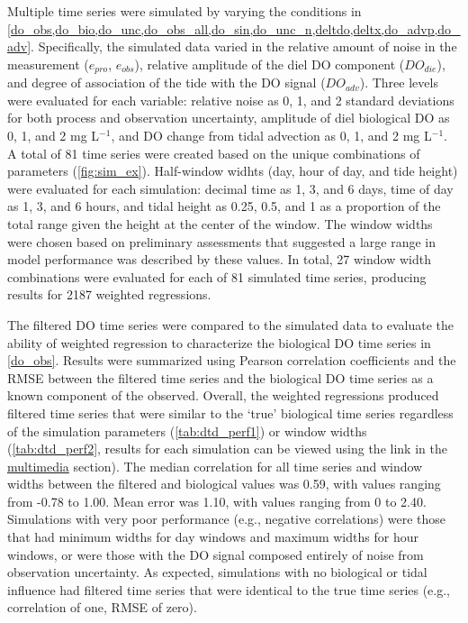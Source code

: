 \documentclass[letterpaper,12pt,oneside]{article}\usepackage[]{graphicx}\usepackage[]{color}
\begin{document}
Multiple time series were simulated by varying the conditions in \cref{do_obs,do_bio,do_unc,do_obs_all,do_sin,do_unc_n,deltdo,deltx,do_advp,do_adv}. Specifically, the simulated data varied in the relative amount of noise in the measurement ($e_{pro}$, $e_{obs}$), relative amplitude of the diel \ac{DO} component ($DO_{die}$), and degree of association of the tide with the \ac{DO} signal ($DO_{adv}$).  Three levels were evaluated for each variable: relative noise as 0, 1, and 2 standard deviations for both process and observation uncertainty, amplitude of diel biological \ac{DO} as 0, 1, and 2 mg L$^{-1}$, and \ac{DO} change from tidal advection as 0, 1, and 2 mg L$^{-1}$. A total of 81 time series were created based on the unique combinations of parameters (\cref{fig:sim_ex}).  Half-window widhts (day, hour of day, and tide height) were evaluated for each simulation: decimal time as 1, 3, and 6 days, time of day as 1, 3, and 6 hours, and tidal height as 0.25, 0.5, and 1 as a proportion of the total range given the height at the center of the window.  The window widths were chosen based on preliminary assessments that suggested a large range in model performance was described by these values.  In total, 27 window width combinations were evaluated for each of 81 simulated time series, producing results for 2187 weighted regressions.

The filtered \ac{DO} time series were compared to the simulated data to evaluate the ability of weighted regression to characterize the biological \ac{DO} time series in \cref{do_obs}. Results were summarized using Pearson correlation coefficients and the \ac{RMSE} between the filtered time series and the biological \ac{DO} time series as a known component of the observed.  Overall, the weighted regressions produced filtered time series that were similar to the `true' biological time series regardless of the simulation parameters (\cref{tab:dtd_perf1}) or window widths (\cref{tab:dtd_perf2}, results for each simulation can be viewed using the link in the \hyperref[multi]{multimedia} section).  The median correlation for all time series and window widths between the filtered and biological values was 0.59, with values ranging from -0.78 to 1.00.  Mean error was 1.10, with values ranging from 0 to 2.40.  Simulations with very poor performance (e.g., negative correlations) were those that had minimum widths for day windows and maximum widths for hour windows, or were those with the \ac{DO} signal composed entirely of noise from observation uncertainty. As expected, simulations with no biological or tidal influence had filtered time series that were identical to the true time series (e.g., correlation of one, \ac{RMSE} of zero).  
\end{document}
